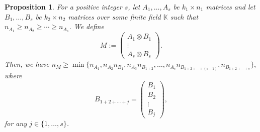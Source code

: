 \documentclass[11pt]{amsart}
\theoremstyle{plain}
\newtheorem{prop}[thm]{Proposition}
\theoremstyle{definition}
\numberwithin{equation}{section}
\newcommand{\K}{\mathbb{K}}
\begin{document}
\begin{prop}\label{bound prop}
For a positive integer $s$, let $A_1,\ldots, A_s$ be $k_1 \times n_1$ matrices and let $B_1,\ldots, B_s$ be $k_2 \times n_2$ matrices over some finite field $\K$ such that $n_{A_1}\geq n_{A_2}\geq \cdots \geq n_{A_s}$. We define \[M:=\begin{pmatrix}
A_1 \otimes B_1\\
\vdots\\
A_s \otimes B_s
\end{pmatrix}.\]
Then, we have $n_M\geq \min\{n_{A_1},n_{A_2}n_{B_1}, n_{A_3}n_{B_{1+2}},\ldots, n_{A_s}n_{B_{1+2+\cdots +(s-1)}},n_{B_{1+2+\cdots +s}}\},$ where \[B_{1+2+\cdots +j}=\begin{pmatrix}
 B_1\\
 B_2\\
\vdots\\
 B_j
\end{pmatrix},\]
for any $j\in\{1,\ldots,s\}$.
\end{prop}
\end{document}
